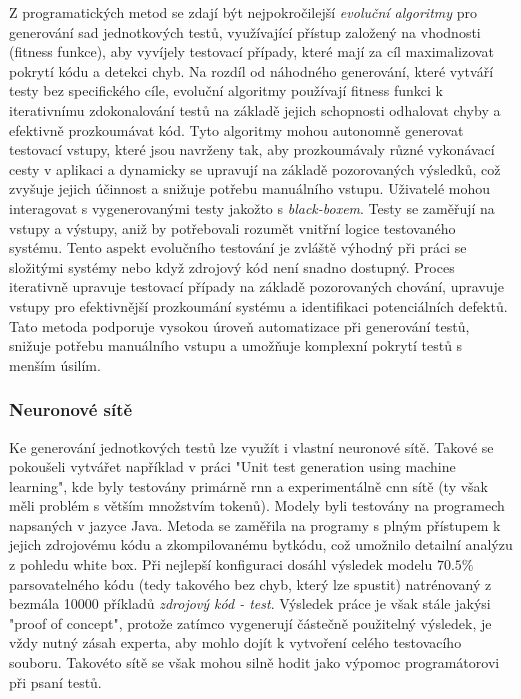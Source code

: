 \documentclass[czech, ma, kiv, he, iso690numb, pdf, viewonly]{fasthesis}
\begin{document}
        Z programatických metod se zdají být nejpokročilejší \emph{evoluční algoritmy} pro generování sad jednotkových testů, využívající přístup založený na vhodnosti (fitness funkce), aby vyvíjely testovací případy, které mají za cíl maximalizovat pokrytí kódu a detekci chyb. Na rozdíl od náhodného generování, které vytváří testy bez specifického cíle, evoluční algoritmy používají fitness funkci k iterativnímu zdokonalování testů na základě jejich schopnosti odhalovat chyby a efektivně prozkoumávat kód. Tyto algoritmy mohou autonomně generovat testovací vstupy, které jsou navrženy tak, aby prozkoumávaly různé vykonávací cesty v aplikaci a dynamicky se upravují na základě pozorovaných výsledků, což zvyšuje jejich účinnost a snižuje potřebu manuálního vstupu. Uživatelé mohou interagovat s vygenerovanými testy jakožto s \textit{black-boxem}. Testy se zaměřují na vstupy a výstupy, aniž by potřebovali rozumět vnitřní logice testovaného systému. Tento aspekt evolučního testování je zvláště výhodný při práci se složitými systémy nebo když zdrojový kód není snadno dostupný. Proces iterativně upravuje testovací případy na základě pozorovaných chování, upravuje vstupy pro efektivnější prozkoumání systému a identifikaci potenciálních defektů. Tato metoda podporuje vysokou úroveň automatizace při generování testů, snižuje potřebu manuálního vstupu a umožňuje komplexní pokrytí testů s menším úsilím. \cite{CAMPOS2018207} \cite{abs-2111-05003}

        \subsubsection{Neuronové sítě}
        Ke generování jednotkových testů lze využít i vlastní neuronové sítě. Takové se pokoušeli vytvářet například v práci "Unit test generation using machine learning"\cite{Saes2018UnitTestGeneration}, kde byly testovány primárně \Acrshort{rnn} a experimentálně \Acrshort{cnn} sítě (ty však měli problém s větším množstvím tokenů). Modely byli testovány na programech napsaných v jazyce Java. Metoda se zaměřila na programy s plným přístupem k jejich zdrojovému kódu a zkompilovanému bytkódu, což umožnilo detailní analýzu z pohledu white box. Při nejlepší konfiguraci dosáhl výsledek modelu \(70.5\%\) parsovatelného kódu (tedy takového bez chyb, který lze spustit) natrénovaný z bezmála 10000 příkladů \textit{zdrojový kód - test}. Výsledek práce je však stále jakýsi "proof of concept", protože zatímco vygenerují částečně použitelný výsledek, je vždy nutný zásah experta, aby mohlo dojít k vytvoření celého testovacího souboru. Takovéto sítě se však mohou silně hodit jako výpomoc programátorovi při psaní testů.
\end{document}

